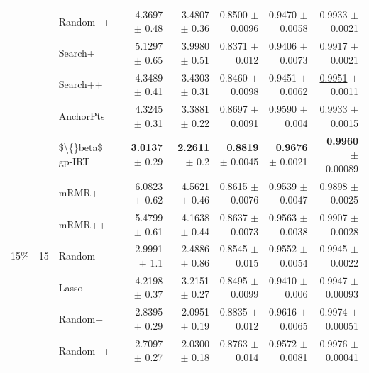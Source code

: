 \begin{longtable}{llp{}rrrrr}
 &  & Random++ & 4.3697 {\scriptsize $\pm$ 0.48} & 3.4807 {\scriptsize $\pm$ 0.36} & 0.8500 {\scriptsize $\pm$ 0.0096} & 0.9470 {\scriptsize $\pm$ 0.0058} & 0.9933 {\scriptsize $\pm$ 0.0021} \\
 &  & Search+ & 5.1297 {\scriptsize $\pm$ 0.65} & 3.9980 {\scriptsize $\pm$ 0.51} & 0.8371 {\scriptsize $\pm$ 0.012} & 0.9406 {\scriptsize $\pm$ 0.0073} & 0.9917 {\scriptsize $\pm$ 0.0021} \\
 &  & Search++ & 4.3489 {\scriptsize $\pm$ 0.41} & 3.4303 {\scriptsize $\pm$ 0.31} & 0.8460 {\scriptsize $\pm$ 0.0098} & 0.9451 {\scriptsize $\pm$ 0.0062} & \underline{0.9951} {\scriptsize $\pm$ 0.0011} \\
 &  & AnchorPts & 4.3245 {\scriptsize $\pm$ 0.31} & 3.3881 {\scriptsize $\pm$ 0.22} & 0.8697 {\scriptsize $\pm$ 0.0091} & 0.9590 {\scriptsize $\pm$ 0.004} & 0.9933 {\scriptsize $\pm$ 0.0015} \\
 &  & \$\textbackslash\{\}beta\$ gp-IRT & \textbf{3.0137} {\scriptsize $\pm$ 0.29} & \textbf{2.2611} {\scriptsize $\pm$ 0.2} & \textbf{0.8819} {\scriptsize $\pm$ 0.0045} & \textbf{0.9676} {\scriptsize $\pm$ 0.0021} & \textbf{0.9960} {\scriptsize $\pm$ 0.00089} \\
 &  & mRMR+ & 6.0823 {\scriptsize $\pm$ 0.62} & 4.5621 {\scriptsize $\pm$ 0.46} & 0.8615 {\scriptsize $\pm$ 0.0076} & 0.9539 {\scriptsize $\pm$ 0.0047} & 0.9898 {\scriptsize $\pm$ 0.0025} \\
 &  & mRMR++ & 5.4799 {\scriptsize $\pm$ 0.61} & 4.1638 {\scriptsize $\pm$ 0.44} & 0.8637 {\scriptsize $\pm$ 0.0073} & 0.9563 {\scriptsize $\pm$ 0.0038} & 0.9907 {\scriptsize $\pm$ 0.0028} \\
\midrule
15\% & 15 & Random & 2.9991 {\scriptsize $\pm$ 1.1} & 2.4886 {\scriptsize $\pm$ 0.86} & 0.8545 {\scriptsize $\pm$ 0.015} & 0.9552 {\scriptsize $\pm$ 0.0054} & 0.9945 {\scriptsize $\pm$ 0.0022} \\
 &  & Lasso & 4.2198 {\scriptsize $\pm$ 0.37} & 3.2151 {\scriptsize $\pm$ 0.27} & 0.8495 {\scriptsize $\pm$ 0.0099} & 0.9410 {\scriptsize $\pm$ 0.006} & 0.9947 {\scriptsize $\pm$ 0.00093} \\
 &  & Random+ & 2.8395 {\scriptsize $\pm$ 0.29} & 2.0951 {\scriptsize $\pm$ 0.19} & 0.8835 {\scriptsize $\pm$ 0.012} & 0.9616 {\scriptsize $\pm$ 0.0065} & 0.9974 {\scriptsize $\pm$ 0.00051} \\
 &  & Random++ & 2.7097 {\scriptsize $\pm$ 0.27} & 2.0300 {\scriptsize $\pm$ 0.18} & 0.8763 {\scriptsize $\pm$ 0.014} & 0.9572 {\scriptsize $\pm$ 0.0081} & 0.9976 {\scriptsize $\pm$ 0.00041} \\

\end{longtable}
